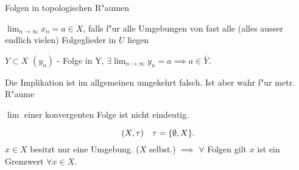 \documentclass[class=article, crop=false]{standalone}
\begin{document}
\begin{zettel}{Folgen in topologischen R"aumen}
\begin{flashcard}[]{}
	\begin{definition}[Limes]
		$\lim_{n \to \infty} x_n =  a \in X$, falls f"ur alle Umgebungen von fast alle (alles ausser endlich vielen) Folgeglieder  in $U$ liegen
	\end{definition}
\end{flashcard}
\begin{lemma}
	$Y \subset X$ $(y_n)$ - Folge in Y, $\exists \lim_{n \to \infty}y_n = a \implies  a \in  \bar{Y}$.
\end{lemma}
\begin{remark}
	Die Implikation ist im allgemeinen umgekehrt falsch. Ist aber wahr f"ur metr. R"aume
\end{remark}
\begin{remark}
	$\lim$ einer konvergenten Folge ist nicht eindeutig.

	\begin{example}
		\[
			(X, \tau ) \quad \tau =  \set{\emptyset, X}
		.\]
		$ x \in  X$ besitzt nur eine Umgebung. ($X$ selbst.) $\implies $  $\forall $ Folgen gilt $x$ ist ein Grenzwert $\forall x \in  X$.
	\end{example}

\end{remark}
\end{zettel}
\end{document}
